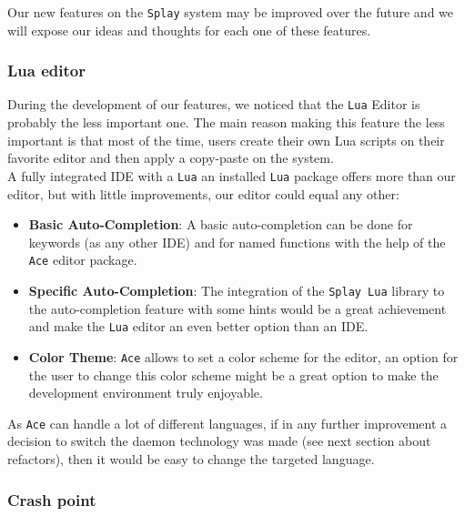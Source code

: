 \documentclass{eplmastersthesis}
\begin{document}
        Our new features on the \texttt{Splay} system may be improved over the future
        and we will expose our ideas and thoughts for each one of these
        features.

        \subsubsection{Lua editor}

        During the development of our features, we noticed that the \texttt{Lua} Editor
        is probably the less important one. The main reason making this feature
        the less important is that most of the time, users create their own Lua
        scripts on their favorite editor and then apply a copy-paste on the
        system.\\
        A fully integrated IDE with a \texttt{Lua} an installed \texttt{Lua} package offers more
        than our editor, but with little improvements, our editor could equal
        any other:

        \begin{itemize}
          \item \textbf{Basic Auto-Completion}: A basic auto-completion can be
          done for keywords (as any other IDE) and for named functions with
          the help of the \texttt{Ace} editor package.
          \item \textbf{Specific Auto-Completion}: The integration of the \texttt{Splay
          Lua} library to the auto-completion feature with some hints would
          be a great achievement and make the \texttt{Lua} editor an even better
          option than an IDE.
          \item \textbf{Color Theme}: \texttt{Ace} allows to set a color scheme for
          the editor, an option for the user to change this color scheme
          might be a great option to make the development environment
          truly enjoyable.
        \end{itemize}

        As \texttt{Ace} can handle a lot of different languages, if in any further
        improvement a decision to switch the daemon technology was made (see
        next section about refactors), then it would be easy to change the
        targeted language.

        \subsubsection{Crash point}
\end{document}
